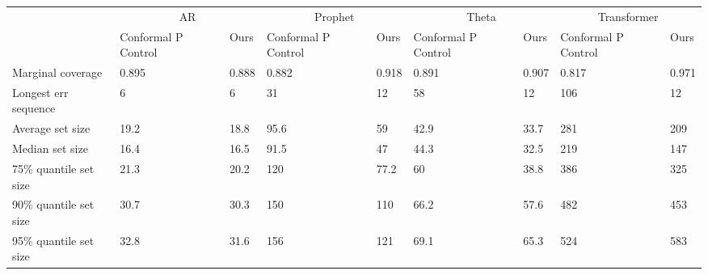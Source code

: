 \begin{tabular}{lllllllll}
\toprule
& \multicolumn{2}{c}{AR}& \multicolumn{2}{c}{Prophet}& \multicolumn{2}{c}{Theta}& \multicolumn{2}{c}{Transformer} \\
& Conformal P Control & Ours & Conformal P Control & Ours & Conformal P Control & Ours & Conformal P Control & Ours \\
\midrule
Marginal coverage & 0.895 & 0.888 & 0.882 & 0.918 & 0.891 & 0.907 & 0.817 & 0.971 \\
Longest err sequence & 6 & 6 & 31 & 12 & 58 & 12 & 106 & 12 \\
Average set size & 19.2 & 18.8 & 95.6 & 59 & 42.9 & 33.7 & 281 & 209 \\
Median set size & 16.4 & 16.5 & 91.5 & 47 & 44.3 & 32.5 & 219 & 147 \\
75\% quantile set size & 21.3 & 20.2 & 120 & 77.2 & 60 & 38.8 & 386 & 325 \\
90\% quantile set size & 30.7 & 30.3 & 150 & 110 & 66.2 & 57.6 & 482 & 453 \\
95\% quantile set size & 32.8 & 31.6 & 156 & 121 & 69.1 & 65.3 & 524 & 583 \\
\bottomrule
\end{tabular}
